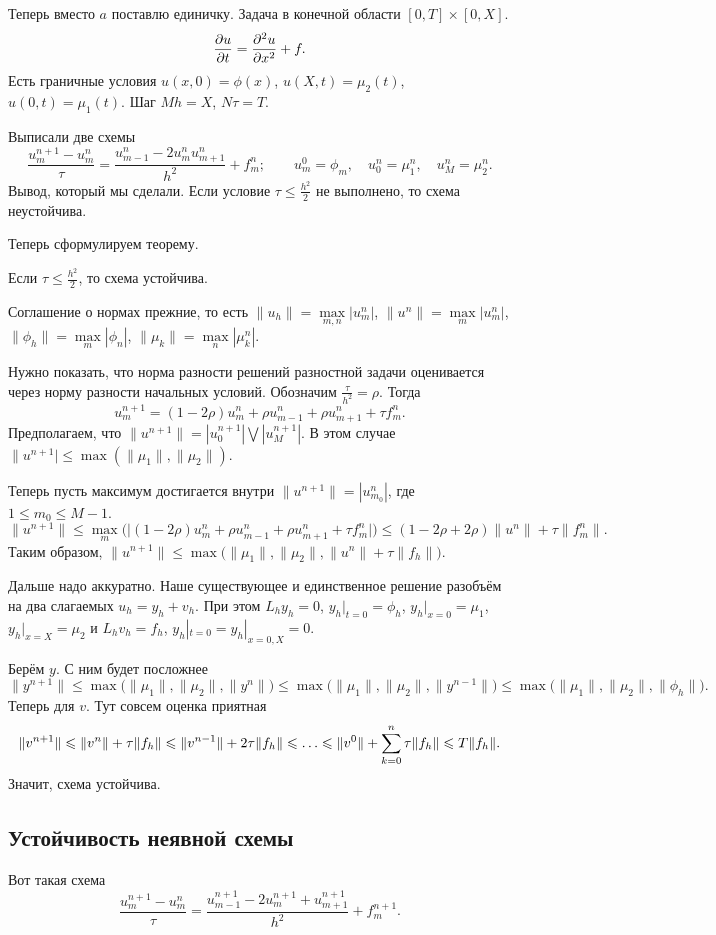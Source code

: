 Теперь вместо $a$ поставлю единичку. Задача в конечной области $[0,T]\times[0,X]$.
\[
  \frac{\partial u}{\partial t} = \frac{\partial ^2u}{\partial x^2} + f.
\]
Есть граничные условия $u(x,0) = \phi(x)$, $u(X,t) = \mu_2(t)$, $u(0,t) = \mu_1(t)$. Шаг $M h = X$, $N\tau = T$.

Выписали две схемы
\[
  \frac{ u_m^{n+1} - u_m^n}{\tau} = \frac{ u_{m-1}^n - 2 u_m^n  u_{m+1}^n}{h^2} + f_m^n;\qquad
  u_m^0 = \phi_m,\quad u_0^n = \mu_1^n,\quad u_M^n = \mu_2^n.
\]
Вывод, который мы сделали. Если условие $\tau\le \frac{h^2}2$ не выполнено, то схема неустойчива.

Теперь сформулируем теорему.
\begin{The}
Если $\tau\le \frac{h^2}2$, то схема устойчива.
\end{The}
Соглашение о нормах прежние, то есть $\|u_h\| = \max\limits_{m,n}|u_m^n|$, $\|u^n\| = \max\limits_m|u_m^n|$, $\|\phi_h\| = \max\limits_m|\phi_n|$, $\|\mu_k\| = \max\limits_n|\mu_k^n|$.
\begin{Proof}
Нужно показать, что норма разности решений разностной задачи оценивается через норму разности начальных условий. Обозначим $\frac\tau{h^2} = \rho$. Тогда
\[
  u_m^{n+1} = (1-2\rho)u_m^n + \rho u_{m-1}^n + \rho u_{m+1}^n + \tau f_m^n.
\]
Предполагаем, что $\|u^{n+1}\| = |u_0^{n+1}|\bigvee |u_M^{n+1}|$. В этом случае $\|u^{n+1}|\le \max(\|\mu_1\|,\|\mu_2\|)$.

Теперь пусть максимум достигается внутри $\|u^{n+1}\| = |u_{m_0}^n|$, где $1\le m_0\le M-1$.
\[
  \|u^{n+1}\|\le\max\limits_m\Big(\big|(1-2\rho)u_m^n + \rho u_{m-1}^n + \rho u_{m+1}^n + \tau f_m^n\big|\Big) \le (1-2\rho + 2\rho)\|u^n\| + \tau \|f_m^n\|.
\]
Таким образом, $\|u^{n+1}\| \le \max\big(\|\mu_1\|,\|\mu_2\|,\|u^n\| + \tau\|f_h\|\big)$.

Дальше надо аккуратно. Наше существующее и единственное решение разобъём на два слагаемых $u_h = y_h + v_h$. При этом $L_h y_h = 0$, $y_h|_{t=0} = \phi_h$, $y_h\big|_{x=0} = \mu_1$, $y_h|_{x=X} = \mu_2$ и $L_hv_h = f_h$, $y_h|_{t=0} = y_h|_{x=0,X}=0$.

Берём $y$. С ним будет посложнее
\[
  \|y^{n+1}\|\le \max\big(\|\mu_1\|,\|\mu_2\|,\|y^n\|\big) \le\max\big(\|\mu_1\|,\|\mu_2\|,\|y^{n-1}\|\big) \le \max\big(\|\mu_1\|,\|\mu_2\|,\|\phi_h\|\big).
\]
Теперь для $v$. Тут совсем оценка приятная
\[
  \|v^{n+1}\|\le \|v^n\| + \tau \|f_h\| \le \|v^{n-1}\| + 2\tau \|f_h\|\le \dots\le \|v^0\| +  \RY k0n\tau\|f_h\| \le T\|f_h\|.
\]
Значит, схема устойчива.
\end{Proof}

\subsection{Устойчивость неявной схемы}
Вот такая схема
\[
  \frac{u_m^{n+1} - u_m^n}{\tau} = \frac{ u_{m-1}^{n+1} - 2u_m^{n+1} + u_{m+1}^{n+1}}{h^2} + f_m^{n+1}.
\]

